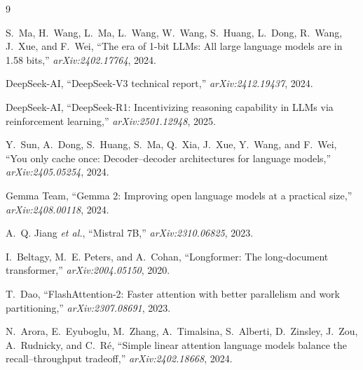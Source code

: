 \documentclass[10pt,conference]{IEEEtran}
\begin{document}
\begin{thebibliography}{9}

S.~Ma, H.~Wang, L.~Ma, L.~Wang, W.~Wang, S.~Huang, L.~Dong, R.~Wang, J.~Xue, and
F.~Wei, ``The era of 1-bit LLMs: All large language models are in 1.58 bits,''
\emph{arXiv:2402.17764}, 2024.

DeepSeek-AI, ``DeepSeek-V3 technical report,'' \emph{arXiv:2412.19437}, 2024.

DeepSeek-AI, ``DeepSeek-R1: Incentivizing reasoning capability in LLMs via
reinforcement learning,'' \emph{arXiv:2501.12948}, 2025.

Y.~Sun, A.~Dong, S.~Huang, S.~Ma, Q.~Xia, J.~Xue, Y.~Wang, and F.~Wei,
``You only cache once: Decoder--decoder architectures for language models,''
\emph{arXiv:2405.05254}, 2024.

Gemma Team, ``Gemma 2: Improving open language models at a practical size,''
\emph{arXiv:2408.00118}, 2024.

A.~Q. Jiang \emph{et al.}, ``Mistral 7B,'' \emph{arXiv:2310.06825}, 2023.

I.~Beltagy, M.~E. Peters, and A.~Cohan, ``Longformer: The long-document
transformer,'' \emph{arXiv:2004.05150}, 2020.

T.~Dao, ``FlashAttention-2: Faster attention with better parallelism and work
partitioning,'' \emph{arXiv:2307.08691}, 2023.

N.~Arora, E.~Eyuboglu, M.~Zhang, A.~Timalsina, S.~Alberti, D.~Zinsley, J.~Zou,
A.~Rudnicky, and C.~R\'e, ``Simple linear attention language models balance the
recall--throughput tradeoff,'' \emph{arXiv:2402.18668}, 2024.

\end{thebibliography}
\end{document}
